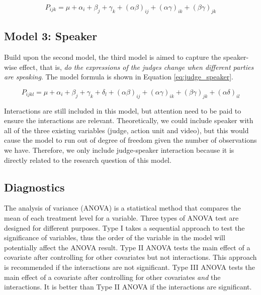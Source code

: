 \documentclass{monashthesis}
\begin{document}
\begin{equation}\label{eq:judge_video}
P_{ijk} = \mu + \alpha_i + \beta_j +\gamma_k + (\alpha\beta)_{ij} + (\alpha\gamma)_{ik} + (\beta\gamma)_{jk}
\end{equation}

\noindent 

\hypertarget{model-3-speaker}{%
\subsection{Model 3: Speaker}\label{model-3-speaker}}

Build upon the second model, the third model is aimed to capture the speaker-wise effect, that is, \emph{do the expressions of the judges change when different parties are speaking}. The model formula is shown in Equation \ref{eq:judge_speaker}.

\begin{equation}\label{eq:judge_speaker}
P_{ijkl} = \mu + \alpha_i + \beta_j +\gamma_k + \delta_l + (\alpha\beta)_{ij} + (\alpha\gamma)_{ik} + (\beta\gamma)_{jk} + (\alpha\delta)_{il}
\end{equation}

Interactions are still included in this model, but attention need to be paid to ensure the interactions are relevant. Theoretically, we could include speaker with all of the three existing variables (judge, action unit and video), but this would cause the model to run out of degree of freedom given the number of observations we have. Therefore, we only include judge-speaker interaction because it is directly related to the research question of this model.

\hypertarget{diagnostics}{%
\subsection{Diagnostics}\label{diagnostics}}

The analysis of variance (ANOVA) is a statistical method that compares the mean of each treatment level for a variable. Three types of ANOVA test are designed for different purposes. Type I takes a sequential approach to test the significance of variables, thus the order of the variable in the model will potentially affect the ANOVA result. Type II ANOVA tests the main effect of a covariate after controlling for other covariates but not interactions. This approach is recommended if the interactions are not significant. Type III ANOVA tests the main effect of a covariate after controlling for other covariates \emph{and} the interactions. It is better than Type II ANOVA if the interactions are significant.
\end{document}
